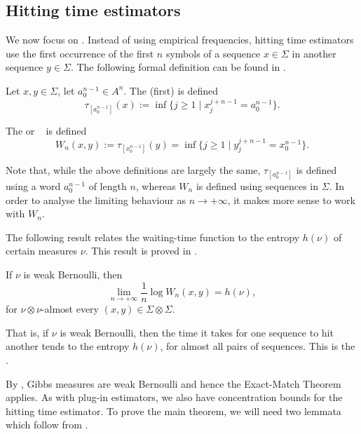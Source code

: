 \subsection{Hitting time estimators}\label{ssec:hitting-times}
We now focus on . Instead of using empirical frequencies, hitting time estimators use the first occurrence of the first $n$ symbols of a sequence $x \in \Sigma$ in another sequence $y \in \Sigma$. The following formal definition can be found in \cite[Definition 2.1]{chazottes-ugalde:hitting-times}.

\begin{definition}
	Let $x, y \in \Sigma$, let $a_0^{n - 1} \in A^n$. The (first)  is defined
	\[
		\tau_{[a_0^{n - 1}]}(x) := \inf\{j \geq 1 \mid x_j^{j + n - 1} = a_0^{n - 1}\}.
	\]
	
	The  or ~\cite[Section III.5]{shields:ergodic} is defined
	\[
		W_n(x, y) := \tau_{[x_0^{n - 1}]}(y) = \inf\{j \geq 1 \mid y_j^{j + n - 1} = x_0^{n - 1}\}.
	\]
\end{definition}

Note that, while the above definitions are largely the same, $\tau_{[a_0^{n - 1}]}$ is defined using a word $a_0^{n - 1}$ of length $n$, whereas $W_n$ is defined using sequences in $\Sigma$. In order to analyse the limiting behaviour as $n \to +\infty$, it makes more sense to work with $W_n$.

The following result relates the waiting-time function to the entropy $h(\nu)$ of certain measures $\nu$. This result is proved in \cite[Theorem III.5.1]{shields:ergodic}.

\begin{theorem} \label{thm:exact-match}
	If $\nu$ is weak Bernoulli, then
	\[
		\lim_{n \to +\infty}{\frac{1}{n}\log{W_n(x, y)}} = h(\nu),
	\]
	for $\nu \otimes \nu$-almost every $(x, y) \in \Sigma \otimes \Sigma$.
\end{theorem}

That is, if $\nu$ is weak Bernoulli, then the time it takes for one sequence to hit another tends to the entropy $h(\nu)$, for almost all pairs of sequences. This is the .

By , Gibbs measures are weak Bernoulli and hence the Exact-Match Theorem applies. As with plug-in estimators, we also have concentration bounds for the hitting time estimator. To prove the main theorem, we will need two lemmata which follow from \cite[Theorem 1]{abadi:sharp}.

